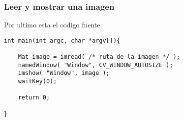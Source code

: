 \begin{frame}[fragile]
   \frametitle{Leer y mostrar una imagen}

    Por ultimo esta el codigo fuente:

    \begin{lstlisting}
int main(int argc, char *argv[]){

    Mat image = imread( /* ruta de la imagen */ );
    namedWindow( "Window", CV_WINDOW_AUTOSIZE );
    imshow( "Window", image );
    waitKey(0);

    return 0;

}
    \end{lstlisting}

\end{frame}
